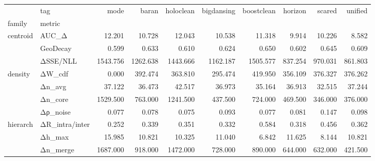\begin{tabular}{@{}llrrrrrrrr@{}}
\toprule
 & tag & mode & baran & holoclean & bigdansing & boostclean & horizon & scared & unified \\
family & metric &  &  &  &  &  &  &  &  \\
\midrule
\multirow[t]{3}{*}{centroid} & AUC_Δ & 12.201 & 10.728 & 12.043 & 10.538 & 11.318 & 9.914 & 10.226 & 8.582 \\
 & GeoDecay & 0.599 & 0.633 & 0.610 & 0.624 & 0.650 & 0.602 & 0.645 & 0.609 \\
 & ΔSSE/NLL & 1543.756 & 1262.638 & 1443.666 & 1162.187 & 1505.577 & 837.254 & 970.031 & 861.803 \\
\cline{1-10}
\multirow[t]{4}{*}{density} & ΔW_cdf & 0.000 & 392.474 & 363.810 & 295.474 & 419.950 & 356.109 & 376.327 & 376.262 \\
 & Δn_avg & 37.122 & 36.473 & 42.517 & 36.973 & 35.164 & 36.913 & 32.515 & 37.244 \\
 & Δn_core & 1529.500 & 763.000 & 1241.500 & 437.500 & 724.000 & 469.500 & 346.000 & 376.000 \\
 & Δρ_noise & 0.077 & 0.078 & 0.075 & 0.093 & 0.077 & 0.081 & 0.147 & 0.098 \\
\cline{1-10}
\multirow[t]{3}{*}{hierarch} & ΔR_intra/inter & 0.252 & 0.339 & 0.351 & 0.332 & 0.584 & 0.318 & 0.456 & 0.362 \\
 & Δh_max & 15.985 & 10.821 & 10.325 & 11.040 & 6.842 & 11.625 & 8.144 & 10.821 \\
 & Δn_merge & 1687.000 & 918.000 & 1472.000 & 728.000 & 890.000 & 644.000 & 632.000 & 421.500 \\
\cline{1-10}
\bottomrule
\end{tabular}
